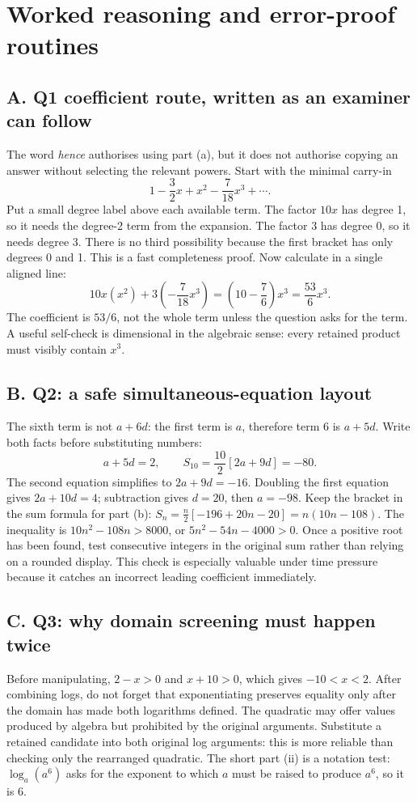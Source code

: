 \documentclass[10pt,a4paper]{article}
\begin{document}
\section*{Worked reasoning and error-proof routines}
\subsection*{A. Q1 coefficient route, written as an examiner can follow}
The word \emph{hence} authorises using part (a), but it does not authorise copying an answer without selecting the relevant powers. Start with the minimal carry-in
\[1-\frac32x+x^2-\frac7{18}x^3+\cdots.\]
Put a small degree label above each available term. The factor $10x$ has degree 1, so it needs the degree-2 term from the expansion. The factor $3$ has degree 0, so it needs degree 3. There is no third possibility because the first bracket has only degrees 0 and 1. This is a fast completeness proof. Now calculate in a single aligned line:
\[10x(x^2)+3\left(-\frac7{18}x^3\right)=\left(10-\frac76\right)x^3=\frac{53}{6}x^3.\]
The coefficient is $53/6$, not the whole term unless the question asks for the term. A useful self-check is dimensional in the algebraic sense: every retained product must visibly contain $x^3$.
\subsection*{B. Q2: a safe simultaneous-equation layout}
The sixth term is not $a+6d$: the first term is $a$, therefore term 6 is $a+5d$. Write both facts before substituting numbers:
\[a+5d=2,\qquad S_{10}=\frac{10}{2}[2a+9d]=-80.\]
The second equation simplifies to $2a+9d=-16$. Doubling the first equation gives $2a+10d=4$; subtraction gives $d=20$, then $a=-98$. Keep the bracket in the sum formula for part (b): $S_n=\frac n2[-196+20n-20]=n(10n-108)$. The inequality is $10n^2-108n>8000$, or $5n^2-54n-4000>0$. Once a positive root has been found, test consecutive integers in the original sum rather than relying on a rounded display. This check is especially valuable under time pressure because it catches an incorrect leading coefficient immediately.
\subsection*{C. Q3: why domain screening must happen twice}
Before manipulating, $2-x>0$ and $x+10>0$, which gives $-10<x<2$. After combining logs, do not forget that exponentiating preserves equality only after the domain has made both logarithms defined. The quadratic may offer values produced by algebra but prohibited by the original arguments. Substitute a retained candidate into both original log arguments: this is more reliable than checking only the rearranged quadratic. The short part (ii) is a notation test: $\log_a(a^6)$ asks for the exponent to which $a$ must be raised to produce $a^6$, so it is $6$.
\end{document}
